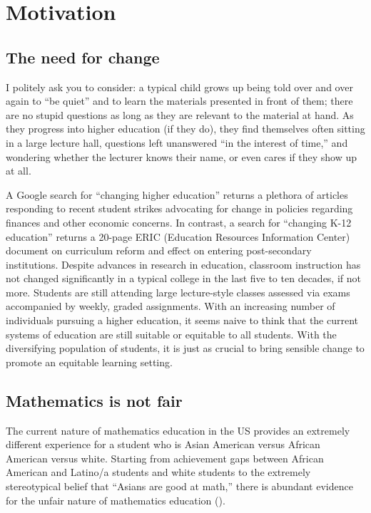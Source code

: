 \chapter{Motivation}

\section{The need for change}
I politely ask you to consider: a typical child grows up being told over and over again to ``be quiet'' and to learn the materials presented in front of them; there are no stupid questions as long as they are relevant to the material at hand. As they progress into higher education (if they do), they find themselves often sitting in a large lecture hall, questions left unanswered ``in the interest of time,'' and wondering whether the lecturer knows their name, or even cares if they show up at all.

A Google search for ``changing higher education'' returns a plethora of articles responding to recent student strikes advocating for change in policies regarding finances and other economic concerns. In contrast, a search for ``changing K-12 education'' returns a 20-page ERIC (Education Resources Information Center) document on curriculum reform and effect on entering post-secondary institutions. Despite advances in research in education, classroom instruction has not changed significantly in a typical college in the last five to ten decades, if not more. Students are still attending large lecture-style classes assessed via exams accompanied by weekly, graded assignments. With an increasing number of individuals pursuing a higher education, it seems naive to think that the current systems of education are still suitable or equitable to all students. With the diversifying population of students, it is just as crucial to bring sensible change to promote an equitable learning setting.

\section{Mathematics is not fair}
The current nature of mathematics education in the US provides an extremely different experience for a student who is Asian American versus African American versus white. Starting from achievement gaps between African American and Latino/a students and white students to  the extremely stereotypical belief that ``Asians are good at math,'' there is abundant evidence for the unfair nature of mathematics education (\cite{alfinio_flores_examining_2007}).

